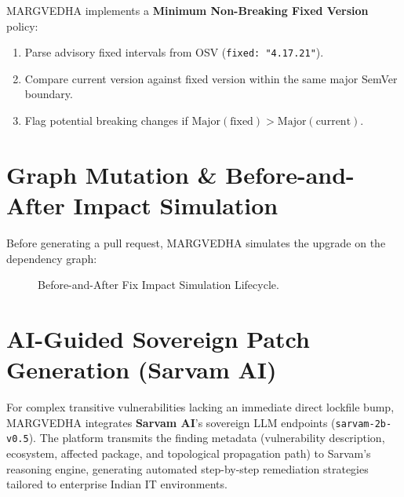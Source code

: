 \documentclass[12pt,a4paper,oneside]{report}
\begin{document}
MARGVEDHA implements a \textbf{Minimum Non-Breaking Fixed Version} policy:
\begin{enumerate}
    \item Parse advisory fixed intervals from OSV (\texttt{fixed: "4.17.21"}).
    \item Compare current version against fixed version within the same major SemVer boundary.
    \item Flag potential breaking changes if $\text{Major}(\text{fixed}) > \text{Major}(\text{current})$.
\end{enumerate}

\section{Graph Mutation \& Before-and-After Impact Simulation}
Before generating a pull request, MARGVEDHA simulates the upgrade on the dependency graph:
\begin{figure}[H]
    \centering
    \caption{Before-and-After Fix Impact Simulation Lifecycle.}
    \label{fig:fix_simulation}
\end{figure}

\section{AI-Guided Sovereign Patch Generation (Sarvam AI)}
For complex transitive vulnerabilities lacking an immediate direct lockfile bump, MARGVEDHA integrates \textbf{Sarvam AI}'s sovereign LLM endpoints (\texttt{sarvam-2b-v0.5}). The platform transmits the finding metadata (vulnerability description, ecosystem, affected package, and topological propagation path) to Sarvam's reasoning engine, generating automated step-by-step remediation strategies tailored to enterprise Indian IT environments.
\end{document}
